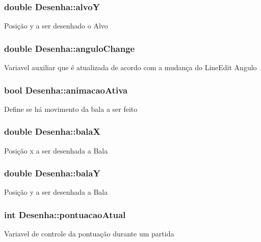 \subsubsection[{alvo\+Y}]{\setlength{\rightskip}{0pt plus 5cm}double Desenha\+::alvo\+Y}\label{class_desenha_aabec73afce4c1bef5b029803b2855857}
Posição y a ser desenhado o Alvo 
\subsubsection[{angulo\+Change}]{\setlength{\rightskip}{0pt plus 5cm}double Desenha\+::angulo\+Change}\label{class_desenha_aa59119fcf8884d6cf5a1f787cbfe3059}
Variavel auxiliar que é atualizada de acordo com a mudança do Line\+Edit Angulo 
\subsubsection[{animacao\+Ativa}]{\setlength{\rightskip}{0pt plus 5cm}bool Desenha\+::animacao\+Ativa}\label{class_desenha_ae3bdc380a414bb24af3525682e4cf32b}
Define se há movimento da bala a ser feito 
\subsubsection[{bala\+X}]{\setlength{\rightskip}{0pt plus 5cm}double Desenha\+::bala\+X}\label{class_desenha_a54b0658f3588ccd45cea5a7b9cca3dfa}
Posição x a ser desenhada a Bala 
\subsubsection[{bala\+Y}]{\setlength{\rightskip}{0pt plus 5cm}double Desenha\+::bala\+Y}\label{class_desenha_a9fa1e6e73def0d551768dace813fc558}
Posição y a ser desenhada a Bala 
\subsubsection[{pontuacao\+Atual}]{\setlength{\rightskip}{0pt plus 5cm}int Desenha\+::pontuacao\+Atual}\label{class_desenha_a566893dd512577f701f3296b9fd028a5}
Variavel de controle da pontuação durante um partida 
